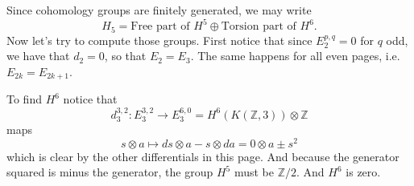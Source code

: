 \documentclass{article}
\numberwithin{equation}{section}
\begin{document}
Since cohomology groups are finitely generated, {\color{magenta}we may write
\[H_{5}=\text{Free part of } H^{5}\oplus \text{Torsion part of } H^{6}.\]}
Now let's try to compute those groups. First notice that since $E_{2}^{p,q}=0$ for $q$ odd, we have that $d_{2}=0$, so that $E_{2}= E_{3}$. The same happens for all even pages, i.e. $E_{2k}=E_{2k+1}$.

To find $H^{6}$ notice that
\[d_{3}^{3,2}:E^{3,2}_{3}\to E^{6,0}_{3}=H^{6}(K(\mathbb{Z},3))\otimes \mathbb{Z}\] 
maps
\[s\otimes a\longmapsto ds\otimes a-s\otimes  da=0\otimes  a\pm s^{2}\]
which is clear by the other differentials in this page. And because the generator squared is minus the generator, the group $H^{5}$ must be $\mathbb{Z}/2$. And $H^{6}$ is zero.

\clearpage
{}
\printbibliography
\clearpage
\end{document}
